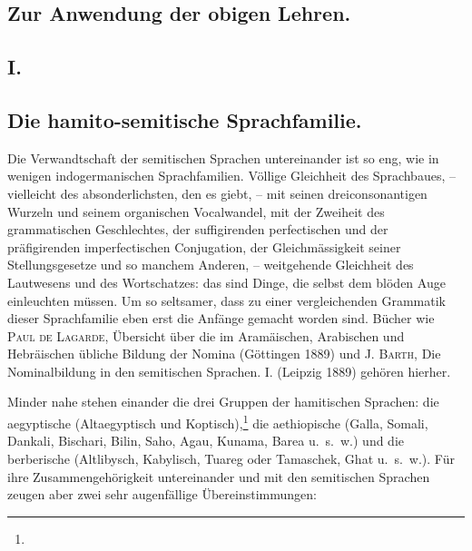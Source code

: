 \subsection*{Zur Anwendung der obigen Lehren.}
\subsection*{I.}\label{III.I.I.4.I}
\subsection*{Die hamito-semitische Sprachfamilie.}
Die Verwandtschaft der semitischen Sprachen untereinander ist so eng, wie in wenigen indogermanischen Sprachfamilien. Völlige Gleichheit des Sprachbaues, – vielleicht des absonderlichsten, den es giebt, – mit seinen dreiconsonantigen Wurzeln und seinem organischen Vocalwandel, mit der Zweiheit des grammatischen Geschlechtes, der suffigirenden perfectischen und der präfigirenden imperfectischen Conjugation, der Gleichmässigkeit seiner Stellungsgesetze und so manchem Anderen, – weitgehende Gleichheit des Lautwesens und des Wortschatzes: das sind Dinge, die selbst dem blöden Auge einleuchten müssen. Um so seltsamer, dass zu einer vergleichenden Grammatik dieser Sprachfamilie eben erst die Anfänge gemacht worden sind. Bücher wie \textsc{Paul de Lagarde}, Übersicht über die im Aramäischen, Arabischen und Hebräischen übliche Bildung der Nomina (Göttingen 1889) und \textsc{J. Barth}, Die Nominalbildung in den semitischen Sprachen. I. (Leipzig 1889) gehören hierher.

\label{fp.171}

Minder nahe stehen einander die drei Gruppen der hamitischen Sprachen: die aegyptische (Altaegyptisch und Koptisch),\footnote{ } die aethiopische (Galla, Somali, Dankali, Bischari, Bilin, Saho, Agau, Kunama, Barea u.~s.~w.) und die berberische (Altlibysch, Kabylisch, Tuareg oder Tamaschek, Ghat u.~s.~w.). Für ihre Zusammengehörigkeit untereinander und mit den semitischen Sprachen zeugen aber zwei sehr augenfällige Übereinstimmungen:

